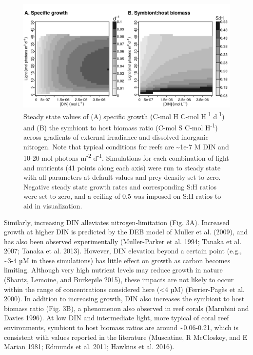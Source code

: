 \documentclass[]{elsarticle} %
\makeatletter
\def\maxwidth{\ifdim\Gin@nat@width>\linewidth\linewidth
\else\Gin@nat@width\fi}
\let\Oldincludegraphics\includegraphics
\renewcommand{\includegraphics}[1]{\Oldincludegraphics[width=\maxwidth]{#1}}
\makeatother
\begin{document}
\begin{figure}[htbp]
\centering
\includegraphics{../img/Fig3.png}
\caption{Steady state values of (A) specific growth (C-mol H C-mol
H\textsuperscript{-1} d\textsuperscript{-1}) and (B) the symbiont to
host biomass ratio (C-mol S C-mol H\textsuperscript{-1}) across
gradients of external irradiance and dissolved inorganic nitrogen. Note
that typical conditions for reefs are \textasciitilde{}1e-7 M DIN and
10-20 mol photons m\textsuperscript{-2} d\textsuperscript{-1}.
Simulations for each combination of light and nutrients (41 points along
each axis) were run to steady state with all parameters at default
values and prey density set to zero. Negative steady state growth rates
and corresponding S:H ratios were set to zero, and a ceiling of 0.5 was
imposed on S:H ratios to aid in visualization.}
\end{figure}

Similarly, increasing DIN alleviates nitrogen-limitation (Fig. 3A).
Increased growth at higher DIN is predicted by the DEB model of Muller
et al. (2009), and has also been observed experimentally (Muller-Parker
et al. 1994; Tanaka et al. 2007; Tanaka et al. 2013). However, DIN
elevation beyond a certain point (e.g., \textasciitilde{}3-4 µM in these
simulations) has little effect on growth as carbon becomes limiting.
Although very high nutrient levels may reduce growth in nature (Shantz,
Lemoine, and Burkepile 2015), these impacts are not likely to occur
within the range of concentrations considered here (\textless{}4 µM)
(Ferrier-Pagès et al. 2000). In addition to increasing growth, DIN also
increases the symbiont to host biomass ratio (Fig. 3B), a phenomenon
also observed in reef corals (Marubini and Davies 1996). At low DIN and
intermediate light, more typical of coral reef environments, symbiont to
host biomass ratios are around \textasciitilde{}0.06-0.21, which is
consistent with values reported in the literature (Muscatine, R
McCloskey, and E Marian 1981; Edmunds et al. 2011; Hawkins et al. 2016).
\end{document}
